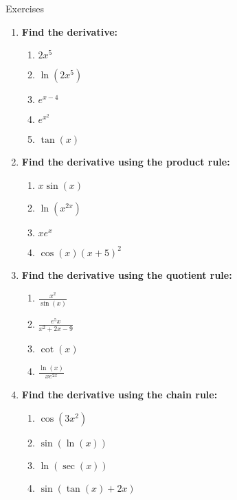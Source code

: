\documentclass[../revisedmain.tex]{subfiles}
\begin{document}
\begin{center}
	{\Large Exercises}
\end{center}
\begin{enumerate}
	\item \textbf{Find the derivative:}
	\begin{enumerate}
		\item \(2x^5\)
		\item \(\ln(2x^5)\)
		\item \(e^{x-4}\)
		\item \(e^{x^2}\)
		\item \(\tan(x)\)
	\end{enumerate}
	\item \textbf{Find the derivative using the product rule:}
	\begin{enumerate}
		\item \(x\sin(x)\)
		\item \(\ln(x^{2x})\)
		\item \(xe^x\)
		\item \(\cos(x)(x+5)^2\)
	\end{enumerate}
	\item \textbf{Find the derivative using the quotient rule:}
	\begin{enumerate}
		\item \(\displaystyle\frac{x^2}{\sin(x)}\)
		\item \(\displaystyle\frac{e^5x}{x^2+2x-9}\)
		\item \(\cot(x)\)
		\item \(\displaystyle\frac{\ln(x)}{xe^{2x}}\)
	\end{enumerate}
	\item \textbf{Find the derivative using the chain rule:}
	\begin{enumerate}
		\item \(\cos(3x^2)\)
		\item \(\sin(\ln(x))\)
		\item \(\ln(\sec(x))\)
		\item \(\sin(\tan(x)+2x)\)
	\end{enumerate}
\end{enumerate}
\end{document}
